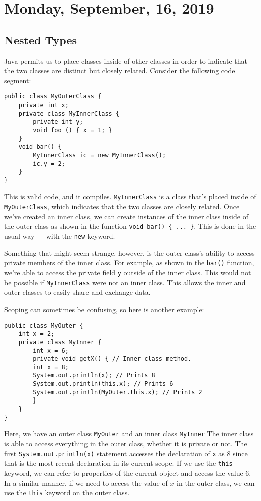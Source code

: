 \section{Monday, September, 16, 2019}
\subsection{Nested Types}
Java permits us to place classes inside of other classes in order to indicate that the two classes are distinct but closely related. Consider the following code segment:

\begin{lstlisting}
public class MyOuterClass {
    private int x;
    private class MyInnerClass {
        private int y;
        void foo () { x = 1; }
    }
    void bar() {
        MyInnerClass ic = new MyInnerClass();
        ic.y = 2;
    }
}
\end{lstlisting}
This is valid code, and it compiles. \verb!MyInnerClass! is a class that's placed inside of \verb!MyOuterClass!, which indicates that the two classes are closely related. Once we've created an inner class, we can create instances of the inner class inside of the outer class as shown in the function \verb!void bar() { ... }!. This is done in the usual way --- with the \verb!new! keyword.

Something that might seem strange, however, is the outer class's ability to access private members of the inner class. For example, as shown in the \verb!bar()! function, we're able to access the private field \verb!y! outside of the inner class. This would not be possible if \verb!MyInnerClass! were not an inner class. This allows the inner and outer classes to easily share and exchange data.


Scoping can sometimes be confusing, so here is another example:

\begin{lstlisting}
public class MyOuter {
    int x = 2;
    private class MyInner {
        int x = 6;
        private void getX() { // Inner class method.
        int x = 8;
        System.out.println(x); // Prints 8
        System.out.println(this.x); // Prints 6
        System.out.println(MyOuter.this.x); // Prints 2
        }
    }
}
\end{lstlisting}

Here, we have an outer class \verb!MyOuter! and an inner class \verb!MyInner! The inner class is able to access everything in the outer class, whether it is private or not. The first \verb!System.out.println(x)! statement accesses the declaration of \verb!x! as $8$ since that is the most recent declaration in its current scope. If we use the \verb!this! keyword, we can refer to properties of the current object and access the value $6$. In a similar manner, if we need to access the value of $x$ in the outer class, we can use the \verb!this! keyword on the outer class. 

